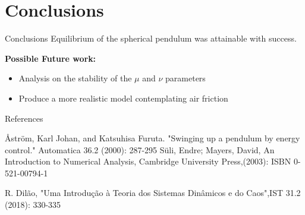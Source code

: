\documentclass{beamer}
\begin{document}
\section{Conclusions}
\begin{frame}{Conclusions}
  Equilibrium of the spherical pendulum was attainable with success.
  
  \textbf{Possible Future work:}
  
  \begin{itemize}
  \item Analysis on the stability of the $\mu$ and $\nu$ parameters
  \item Produce a more realistic model contemplating air friction
  \end{itemize}
\end{frame}
\begin{frame}{References}
  \begin{thebibliography}{99}

 Åström, Karl Johan, and Katsuhisa Furuta. "Swinging up a pendulum by energy control." Automatica 36.2 (2000): 287-295
Süli, Endre; Mayers, David, An Introduction to Numerical Analysis, Cambridge University Press,(2003): ISBN 0-521-00794-1 

 R. Dilão, "Uma Introdução à Teoria dos Sistemas Dinâmicos e do Caos",IST 31.2 (2018): 330-335

\end{thebibliography}
  \end{frame}
\end{document}
